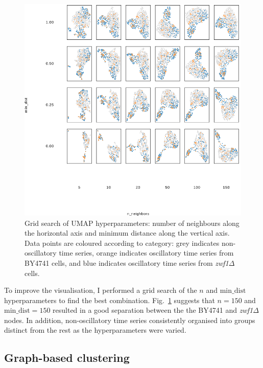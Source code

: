 \begin{figure}
  \centering
    \includegraphics[width=0.9\linewidth]{umap_grid_is20016_edit.png}
    \caption[
      Grid search of UMAP hyperparameters
    ]{
      Grid search of UMAP hyperparameters: number of neighbours along the horizontal axis and minimum distance along the vertical axis.
      Data points are coloured according to category: grey indicates non-oscillatory time series, orange indicates oscillatory time series from BY4741 cells, and blue indicates oscillatory time series from \textit{zwf1$\Delta$} cells.
    }
  \label{fig:umap-gridsearch}
\end{figure}

To improve the visualisation, I performed a grid search of the $n$ and $\mathrm{min\_dist}$ hyperparameters to find the best combination.
Fig.\ \ref{fig:umap-gridsearch} suggests that $n=150$ and $\mathrm{min\_dist} = 150$ resulted in a good separation between the the BY4741 and \textit{zwf1$\Delta$} nodes.
In addition, non-oscillatory time series consistently organised into groups distinct from the rest as the hyperparameters were varied.


\subsection{Graph-based clustering}
\label{subsec:analysis-clustering-graphclustering}

